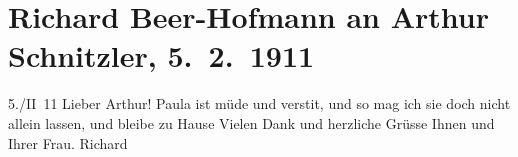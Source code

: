 

         
         \renewcommand{\erwaehntePersonen}{Personen: Richard Beer-Hofmann, Paula Beer-Hofmann, Olga Schnitzler}
         \renewcommand{\erwaehnteOrte}{Orte: Wien}
         \renewcommand{\erwaehnteWerke}{}
               \section[Richard Beer-Hofmann an Arthur Schnitzler, 5. 2. 1911]{ Richard Beer-Hofmann an Arthur Schnitzler, 5. 2. 1911}\nopagebreak{}\rehead{ }\begin{ledgroupsized}[t]{13cm}\normalsize\beginnumbering \toendnotes[C]{\smallbreak\pagebreak[2]} 
\toendnotes[C]{\smallbreak}\pstart
           \raggedleft{}{\pb}5./II 11\pend
           \pstart{}Lieber Arthur!\pend\pstart
           Paula ist müde und versti{\geminationm}t, und so mag ich sie doch nicht allein lassen, und
               bleibe zu Hause\pend
           \pstart
           {\pb}Vielen Dank und herzliche Grüsse
               Ihnen und Ihrer Frau.\pend
           \pstart \spacefill\mbox{Richard}\pend{}
         
         \endnumbering{}\end{ledgroupsized}  \newcommand{\dateiname}{L02003}\newcommand{\titel}{Richard Beer-Hofmann an Arthur Schnitzler, 5. 2. 1911}\newcommand{\editorInnen}{Martin Anton Müller und Gerd-Hermann Susen}
      